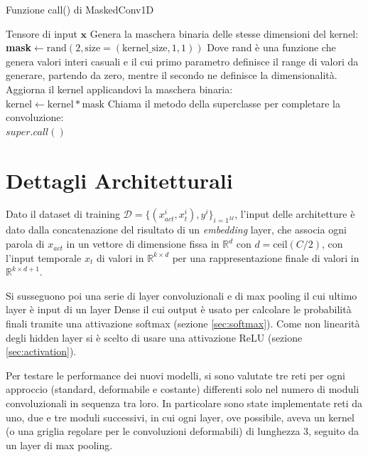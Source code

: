 \documentclass[12pt,a4paper]{report}
\begin{document}
    \begin{algorithm}[t] 
        \caption{Funzione call() di MaskedConv1D}
        \begin{algorithmic} \label{alg:maskcall}
            \REQUIRE Tensore di input $\boldsymbol{x}$
            \STATE Genera la maschera binaria delle stesse dimensioni del kernel:\\
            \quad \textbf{mask}$\gets \text{rand}(2, 
            \text{size}=(\text{kernel\_size}, 1, 1))$
            \STATE Dove rand \`e una funzione che genera valori interi casuali e il 
            cui primo parametro definisce il range di valori da generare, partendo da
            zero, mentre il secondo ne definisce la dimensionalit\`a.
            \STATE Aggiorna il kernel applicandovi la maschera binaria:\\
            $\text{kernel}\gets\text{kernel}*\text{mask}$
            \STATE Chiama il metodo della superclasse per completare la convoluzione:
            \\\quad$super.call()$
        \end{algorithmic}
    \end{algorithm}

    \section{Dettagli Architetturali}
    Dato il dataset di training $\mathcal{D}=\{(x_{act}^i,x_t^i),y^i\}_{i=1^M}$, 
    l'input delle architetture \`e dato dalla concatenazione del risultato di un 
    \textit{embedding} layer, che associa ogni parola di $x_{act}$ in un vettore 
    di dimensione fissa in $\mathbb{R}^d$ con $d=\text{ceil}(C/2)$, con
    l'input temporale $x_t$ di valori in $\mathbb{R}^{k\times d}$ per
    una rappresentazione finale di valori in $\mathbb{R}^{k\times d+1}$.

    Si susseguono poi una serie di layer convoluzionali e di max pooling
    il cui ultimo layer \`e input di un layer Dense il cui output \`e
    usato per calcolare le probabilit\`a finali tramite una attivazione
    softmax (sezione \ref{sec:softmax}). Come non linearit\`a degli 
    hidden layer si \`e scelto di usare una attivazione ReLU (sezione
    \ref{sec:activation}).

    Per testare le performance dei nuovi modelli, si sono valutate tre
    reti per ogni approccio (standard, deformabile e costante) 
    differenti solo nel numero di moduli convoluzionali in sequenza tra
    loro. In particolare sono state implementate reti da uno, due e tre
    moduli successivi, in cui ogni layer, ove possibile, aveva un kernel
    (o una griglia regolare per le convoluzioni deformabili) di 
    lunghezza 3, seguito da un layer di max pooling.
\end{document}
